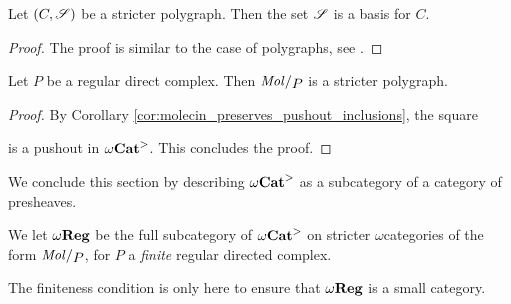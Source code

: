 \begin{lem} \label{lem:stricter_polygraph_basis}
    Let \( (C, \mathscr{S}) \) be a stricter polygraph.
    Then the set \( \mathscr{S} \) is a basis for \( C \).
\end{lem}
\begin{proof}
    The proof is similar to the case of polygraphs, see \cite[Proposition 15.1.8, Lemma 16.6.2]{ara2025polygraphs}.
\end{proof}

\begin{lem} \label{lem:stricter_regular_complex_are_stricter_polygraph}
    Let \( P \) be a regular direct complex.
    Then \( \molecin{P} \) is a stricter polygraph.
\end{lem}
\begin{proof}
    By Corollary \ref{cor:molecin_preserves_pushout_inclusions}, the square
    \begin{center}
    \end{center}
    is a pushout in \( {\omega\mathbf{Cat}}^> \).
    This concludes the proof.
\end{proof}

\noindent We conclude this section by describing \( {\omega\mathbf{Cat}}^> \) as a subcategory of a category of presheaves.

\begin{dfn}
    We let \( \omega\mathbf{Reg} \) be the full subcategory of \( {\omega\mathbf{Cat}}^> \) on stricter \( \omega \)\nbd categories of the form \( \molecin{P} \), for \( P \) a \emph{finite} regular directed complex.
\end{dfn}

\begin{comm}
    The finiteness condition is only here to ensure that \( \omega\mathbf{Reg} \) is a small category. 
\end{comm}

